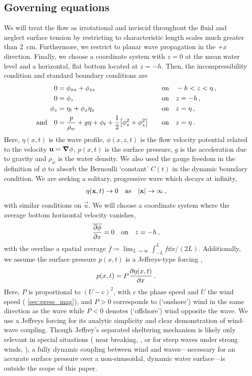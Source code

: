 \documentclass{jfm}
\begin{document}
\subsection{Governing equations}
We will treat the flow as irrotational and inviscid throughout the
fluid and neglect surface tension by restricting to characteristic
length scales much greater than \SI{2}{\centi\meter}.
Furthermore, we restrict to planar wave propagation in the $+x$
direction.
Finally, we choose a coordinate system with $z=0$ at the mean water
level and a horizontal, flat bottom located at $z=-h$.
Then, the incompressibility condition and standard boundary conditions
are
\begin{alignat}{2}
  0 &= \phi_{xx} + \phi_{zz} &&\qq{on}
  -h < z < \eta \,, \label{eq:laplace}\\
  0 &= \phi_{z} &&\qq{on} z=-h \,, \label{eq:bottom_bc}\\
  \phi_{z} &= \eta_{t} + \phi_{x} \eta_{x} &&\qq{on} z = \eta \,,
  \label{eq:kinematic_bc}\\
  \qq*{and} 0 &= \frac{p}{\rho_w} + g\eta + \phi_{t} +
  \frac{1}{2} \bqty{\phi_{x}^2 + \phi_{z}^2} &&\qq{on} z=
  \eta \,. \label{eq:dynamic_bc}
\end{alignat}
Here, $\eta(x,t)$ is the wave profile, $\phi(x,z,t)$ is the flow
velocity potential related to the velocity $\mathbf{\bm{u}} = \grad{\phi}$,
$p(x,t)$ is the surface pressure, $g$ is the acceleration due to
gravity and $\rho_w$ is the water density.
We also used the gauge freedom in the definition of $\phi$ to absorb the
Bernoulli `constant' $C(t)$ in the dynamic boundary condition.
We are seeking a solitary, progressive wave which decays at infinity,
\begin{gather}
  \eta(\vec{x},t) \to 0 \qq{as} \abs{\vec{x}} \to \infty \,,
\end{gather}
with similar conditions on $\vec{u}$.
We will choose a coordinate system where the average bottom horizontal
velocity vanishes,
\begin{equation}
  \overline{ \pdv{\phi}{x} } = 0 \qq{on} z=-h \,,
  \label{eq:bot_bc_horz}
\end{equation}
with the overline a spatial average $\overline{f} \coloneqq
\lim_{L\to\infty} \int_{-L}^{L} f \dd{x} / (2L)$.
Additionally, we assume the surface pressure $p(x,t)$ is a Jeffreys-type
forcing \citep{jeffreys1925formation},
\begin{equation}
  p(x,t) = P \pdv{\eta(x,t)}{x} \,.
\end{equation}
Here, $P$ is proportional to $(U-c)^2$, with $c$ the phase speed and $U$
the wind speed (\cf{} \cref{sec:press_mag}), and $P>0$ corresponds to
(`onshore') wind in the same direction as the wave while $P<0$ denotes
(`offshore') wind opposite the wave.
We use a Jeffreys forcing for its analytic simplicity and clear
demonstration of wind-wave coupling.
Though Jeffrey's separated sheltering mechanism is likely only relevant
in special situations (\eg{} near breaking,
\citealp{banner1976separation}, or for steep waves under strong winds,
\citealp{tian2013evolution,touboul2006interaction}),
a fully dynamic coupling between wind and waves---necessary for an
accurate surface pressure over a non-sinusoidal, dynamic water
surface---is outside the scope of this paper.
\end{document}
